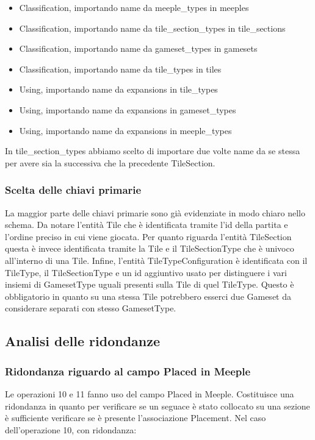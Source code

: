 \begin{itemize}
    \item Classification, importando name da meeple\_types in meeples
    \item Classification, importando name da tile\_section\_types in tile\_sections
    \item Classification, importando name da gameset\_types in gamesets
    \item Classification, importando name da tile\_types in tiles
    \item Using, importando name da expansions in tile\_types
    \item Using, importando name da expansions in gameset\_types
    \item Using, importando name da expansions in meeple\_types
\end{itemize}
In tile\_section\_types abbiamo scelto di importare due volte name da se stessa per avere sia la successiva che la precedente TileSection.

\subsubsection*{Scelta delle chiavi primarie}
La maggior parte delle chiavi primarie sono già evidenziate in modo chiaro nello schema. Da notare l'entità Tile che è identificata tramite l'id della partita e l'ordine preciso in cui viene giocata. Per quanto riguarda l'entità TileSection questa è invece identificata tramite la Tile e il TileSectionType che è univoco all'interno di una Tile. Infine, l'entità TileTypeConfiguration è identificata con il TileType, il TileSectionType e un id aggiuntivo usato per distinguere i vari insiemi di GamesetType uguali presenti sulla Tile di quel TileType. Questo è obbligatorio in quanto su una stessa Tile potrebbero esserci due Gameset da considerare separati con stesso GamesetType.

\subsection{Analisi delle ridondanze}

\subsubsection*{Ridondanza riguardo al campo Placed in Meeple}
Le operazioni 10 e 11 fanno uso del campo Placed in Meeple. Costituisce una ridondanza in quanto per verificare se un seguace è stato collocato su una sezione è sufficiente verificare se è presente l'associazione Placement. Nel caso dell'operazione 10, con ridondanza:
\medskip


